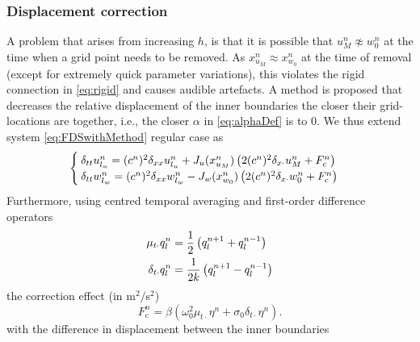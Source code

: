 \subsubsection{Displacement correction}\label{sec:dispCorr}
A problem that arises from increasing $h$, is that it is possible that $u_M^n \not\approx w_0^n$ at the time when a grid point needs to be removed. As $x_{u_M}^n \approx x_{w_0}^n$ at the time of removal (except for extremely quick parameter variations), this violates the rigid connection in \eqref{eq:rigid} and causes audible artefacts. A method is proposed that decreases the relative displacement of the inner boundaries the closer their grid-locations are together, i.e., the closer $\alpha$ in \eqref{eq:alphaDef} is to 0. We thus extend system \eqref{eq:FDSwithMethod} regular case as
\begin{equation}\label{eq:sysDispCorr}
\begin{cases}
    \delta_{tt}u_{l_u}^n = (c^n)^2\delta_{xx}u_{l_u}^n+ J_u(x_{u_M}^n)\left(2(c^n)^2\delta_{x\cdot}u_M^n + F_\text{c}^n\right)\\
    \delta_{tt}w_{l_w}^n = (c^n)^2\delta_{xx}w_{l_w}^n - J_w(x_{w_0}^n)\left(2(c^n)^2\delta_{x\cdot}w_0^n+F_\text{c}^n\right)
\end{cases}
\end{equation}
  \MDcomment[Cool!]Furthermore, using centred temporal averaging and first-order difference operators
\begin{subequations}\label{eq:centredOperators}
\begin{align}\label{eq:centredAverage}
    \mu_{t\cdot}q_l^n &= \frac{1}{2} \left(q_l^{n+1} + q_l^{n-1}\right)\\
    \delta_{t\cdot}q_l^n &= \frac{1}{2k} \left(q_l^{n+1} - q_l^{n-1}\right)
\end{align}
\end{subequations}
the correction effect (in m$^2/$s$^2$) %
\begin{equation}\label{eq:dispCorrForce}
    F_\text{c}^n = \beta \left(\omega_0^2\mu_{t\cdot}\eta^n +\sigma_0\delta_{t\cdot}\eta^n \right).
\end{equation}
with the difference in displacement between the inner boundaries
